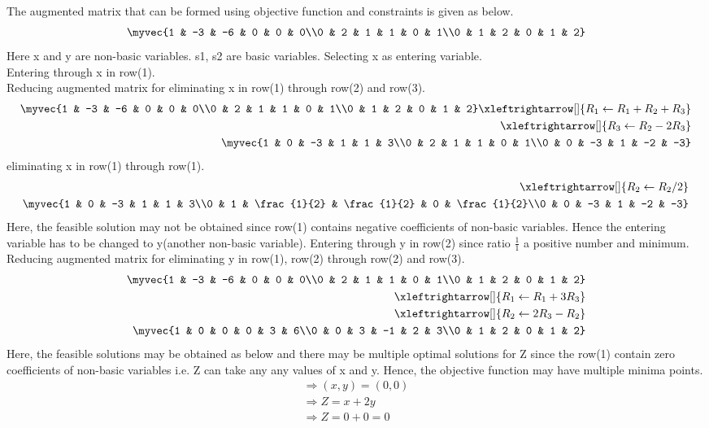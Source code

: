 The augmented matrix that can be formed using objective function and constraints is given as below.
\begin{align}
\myvec{1 & -3 & -6 & 0 & 0 & 0\\0 & 2 & 1 & 1 & 0 & 1\\0 & 1 & 2 & 0 & 1 & 2}
\end{align}
Here x and y are non-basic variables. s1, s2 are basic variables. Selecting x as entering variable.\\
Entering through x in row(1).\\
Reducing augmented matrix for eliminating x in row(1) through row(2) and row(3).
\begin{align}
\myvec{1 & -3 & -6 & 0 & 0 & 0\\0 & 2 & 1 & 1 & 0 & 1\\0 & 1 & 2 & 0 & 1 & 2}
\xleftrightarrow[]{R_1 \leftarrow {R_1+R_2+R_3}}\\
\xleftrightarrow[]{R_3 \leftarrow {R_2-2R_3}}\\
\myvec{1 & 0 & -3 & 1 & 1 & 3\\0 & 2 & 1 & 1 & 0 & 1\\0 & 0 & -3 & 1 & -2 & -3}
\end{align}
eliminating x in row(1) through row(1).
\begin{align}
\xleftrightarrow[]{R_2 \leftarrow {R_2/2}}\\
\myvec{1 & 0 & -3 & 1 & 1 & 3\\0 & 1 & \frac{1}{2} & \frac{1}{2} & 0 & \frac{1}{2}\\0 & 0 & -3 & 1 & -2 & -3}
\end{align}
Here, the feasible solution may not be obtained since row(1) contains negative coefficients of non-basic variables. Hence the entering variable has to be changed to y(another non-basic variable).
Entering through y in row(2) since ratio $\frac{1}{1}$ a positive number and minimum.\\
Reducing augmented matrix for eliminating y in row(1), row(2) through row(2) and row(3).
\begin{align}
\myvec{1 & -3 & -6 & 0 & 0 & 0\\0 & 2 & 1 & 1 & 0 & 1\\0 & 1 & 2 & 0 & 1 & 2}\\
\xleftrightarrow[]{R_1 \leftarrow {R_1+3R_3}}\\
\xleftrightarrow[]{R_2 \leftarrow {2R_3-R_2}}\\
\myvec{1 & 0 & 0 & 0 & 3 & 6\\0 & 0 & 3 & -1 & 2 & 3\\0 & 1 & 2 & 0 & 1 & 2}
\end{align}
Here, the feasible solutions may be obtained as below and there may be multiple optimal solutions for Z since the row(1) contain zero coefficients of non-basic variables i.e. Z can take any any values of x and y. Hence, the objective function may have multiple minima points.
\begin{align}
\Rightarrow (x,y)=(0,0)\\
\Rightarrow Z=x+2y\\
\Rightarrow Z=0+0=0
\end{align}

